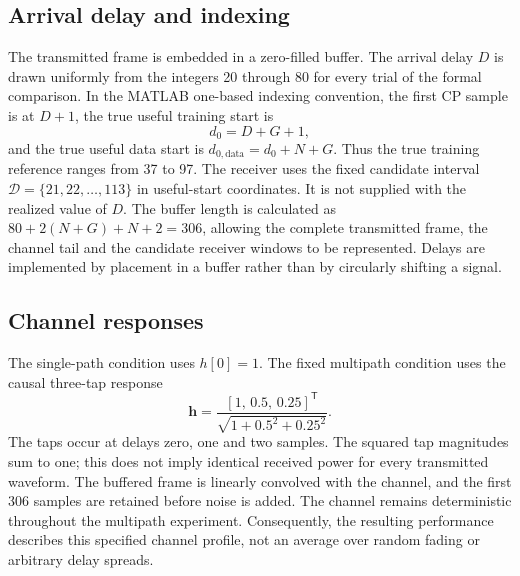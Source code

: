 \subsection{Arrival delay and indexing}
The transmitted frame is embedded in a zero-filled buffer. The arrival delay $D$ is drawn uniformly from the integers 20 through 80 for every trial of the formal comparison. In the MATLAB one-based indexing convention, the first CP sample is at $D+1$, the true useful training start is
\begin{equation}
 d_0=D+G+1,
\end{equation}
and the true useful data start is $d_{0,\mathrm{data}}=d_0+N+G$. Thus the true training reference ranges from 37 to 97. The receiver uses the fixed candidate interval $\mathcal{D}=\{21,22,\ldots,113\}$ in useful-start coordinates. It is not supplied with the realized value of $D$. The buffer length is calculated as $80+2(N+G)+N+2=306$, allowing the complete transmitted frame, the channel tail and the candidate receiver windows to be represented. Delays are implemented by placement in a buffer rather than by circularly shifting a signal.

\subsection{Channel responses}
The single-path condition uses $h[0]=1$. The fixed multipath condition uses the causal three-tap response
\begin{equation}
 \mathbf{h}=\frac{[1,\,0.5,\,0.25]^{\mathsf T}}
 {\sqrt{1+0.5^2+0.25^2}}.
 \label{eq:method_channel}
\end{equation}
The taps occur at delays zero, one and two samples. The squared tap magnitudes sum to one; this does not imply identical received power for every transmitted waveform. The buffered frame is linearly convolved with the channel, and the first 306 samples are retained before noise is added. The channel remains deterministic throughout the multipath experiment. Consequently, the resulting performance describes this specified channel profile, not an average over random fading or arbitrary delay spreads.

